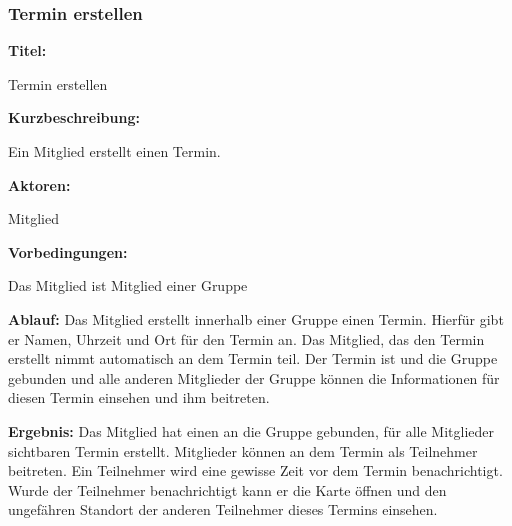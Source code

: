 \documentclass{scrartcl}
\begin{document}
	\subsubsection{Termin erstellen}
	\begin{description}
		\item \textbf{Titel:}
		\begin{description}
			\item Termin erstellen
		\end{description}
		\item \textbf{Kurzbeschreibung:}
		\begin{description}
			\item Ein Mitglied erstellt einen Termin.
		\end{description}
		\item \textbf{Aktoren:}
		\begin{description}
			\item Mitglied
		\end{description}
		\item \textbf{Vorbedingungen:}
		\begin{description}
			\item Das Mitglied ist Mitglied einer Gruppe
		\end{description}
		\item \textbf{Ablauf:} \newline Das Mitglied erstellt innerhalb einer Gruppe einen Termin. Hierfür gibt er Namen, Uhrzeit und Ort für den Termin an. Das Mitglied, das den Termin erstellt nimmt automatisch an dem Termin teil. Der Termin ist und die Gruppe gebunden und alle anderen Mitglieder der Gruppe können die Informationen für diesen Termin einsehen und ihm beitreten.
		\item \textbf{Ergebnis:} \newline Das Mitglied hat einen an die Gruppe gebunden, für alle Mitglieder sichtbaren Termin erstellt. Mitglieder können an dem Termin als Teilnehmer beitreten. Ein Teilnehmer wird eine gewisse Zeit vor dem Termin benachrichtigt. Wurde der Teilnehmer benachrichtigt kann er die Karte öffnen und den ungefähren Standort der anderen Teilnehmer dieses Termins einsehen.
	\end{description}
	
	\newpage
	
\end{document}
